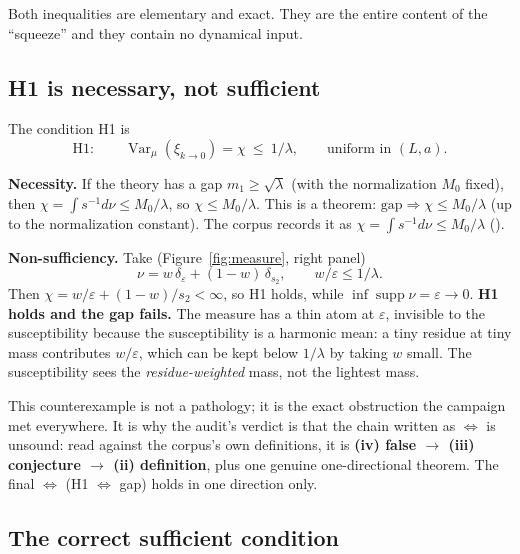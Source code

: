 Both inequalities are elementary and exact. They are the entire content of the ``squeeze'' and
they contain no dynamical input.

\subsection{H1 is necessary, not sufficient}

The condition H1 is
\begin{equation}
\mathrm{H1}:\qquad \operatorname{Var}_\mu(\xi_{k\to0})=\chi\ \le\ 1/\lambda,
\qquad\text{uniform in }(L,a).
\label{eq:h1}
\end{equation}

\textbf{Necessity.} If the theory has a gap $m_1\ge\sqrt\lambda$ (with the normalization $M_0$
fixed), then $\chi=\int s^{-1}d\nu\le M_0/\lambda$, so $\chi\le M_0/\lambda$. This is a
theorem: $\text{gap}\Rightarrow\chi\le M_0/\lambda$ (up to the normalization constant). The
corpus records it as $\chi=\int s^{-1}d\nu\le M_0/\lambda$ ().

\textbf{Non-sufficiency.} Take (Figure~\ref{fig:measure}, right panel)
\begin{equation}
\nu=w\,\delta_\varepsilon+(1-w)\,\delta_{s_2},\qquad w/\varepsilon\le1/\lambda .
\label{eq:thinatom}
\end{equation}
Then $\chi=w/\varepsilon+(1-w)/s_2<\infty$, so H1 holds, while
$\inf\operatorname{supp}\nu=\varepsilon\to0$. \textbf{H1 holds and the gap fails.} The measure
has a thin atom at $\varepsilon$, invisible to the susceptibility because the susceptibility is
a harmonic mean: a tiny residue at tiny mass contributes $w/\varepsilon$, which can be kept
below $1/\lambda$ by taking $w$ small. The susceptibility sees the \emph{residue-weighted}
mass, not the lightest mass.

This counterexample is not a pathology; it is the exact obstruction the campaign met
everywhere. It is why the audit's verdict is that the chain written as $\iff$ is unsound: read
against the corpus's own definitions, it is \textbf{(iv) false $\to$ (iii) conjecture $\to$
(ii) definition}, plus one genuine one-directional theorem. The final $\iff$ (H1 $\iff$ gap)
holds in one direction only.

\figmeasure

\subsection{The correct sufficient condition}


